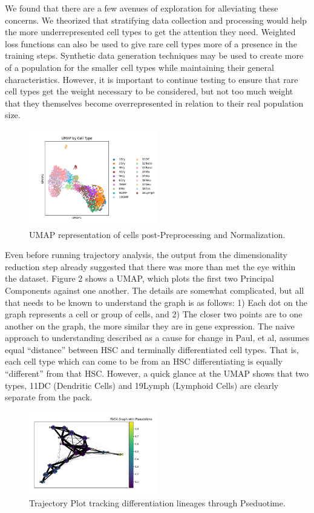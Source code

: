 \documentclass{article}
\begin{document}
We found that there are a few avenues of exploration for alleviating these concerns. We theorized that stratifying data collection and processing would help the more underrepresented cell types to get the attention they need. Weighted loss functions can also be used to give rare cell types more of a presence in the training steps. Synthetic data generation techniques may be used to create more of a population for the smaller cell types while maintaining their general characteristics. However, it is important to continue testing to ensure that rare cell types get the weight necessary to be considered, but not too much weight that they themselves become overrepresented in relation to their real population size. 


\begin{figure}[h]
\centering
\includegraphics[width=0.5\textwidth]{./images/umap_cell_types.png}
\caption{UMAP representation of cells post-Preprocessing and Normalization.}
\end{figure}


Even before running trajectory analysis, the output from the dimensionality reduction step already suggested that there was more than met the eye within the dataset. Figure 2 shows a UMAP, which plots the first two Principal Components against one another. The details are somewhat complicated, but all that needs to be known to understand the graph is as follows: 1) Each dot on the graph represents a cell or group of cells, and 2) The closer two points are to one another on the graph, the more similar they are in gene expression. The naive approach to understanding described as a cause for change in Paul, et al, assumes equal “distance” between HSC and terminally differentiated cell types. That is, each cell type which can come to be from an HSC differentiating is equally “different” from that HSC. However, a quick glance at the UMAP shows that two types, 11DC (Dendritic Cells) and 19Lymph (Lymphoid Cells) are clearly separate from the pack. 


\begin{figure}[h]
\centering
\includegraphics[width=0.5\textwidth]{./images/paga_graph_pseudotime.png}
\caption{Trajectory Plot tracking differentiation lineages through Pseduotime.}
\end{figure}
\end{document}
